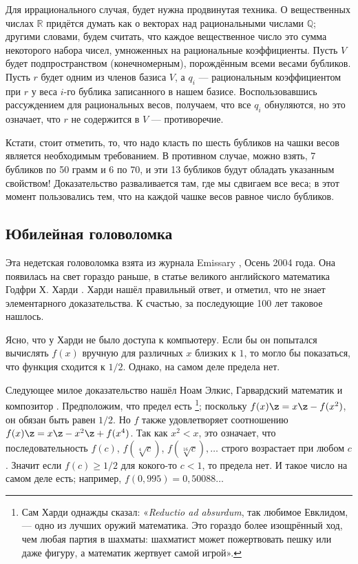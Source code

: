 Для иррационального случая, будет нужна продвинутая техника.
О вещественных числах $\mathbb{R}$ придётся думать как о векторах над рациональными числами $\mathbb{Q}$;
другими словами, будем считать, что каждое вещественное число это сумма некоторого набора чисел, умноженных на рациональные коэффициенты.
Пусть $V$ будет подпространством (конечномерным), порождённым всеми весами бубликов.
Пусть $r$ будет одним из членов базиса $V$, а $q_i$ --- рациональным коэффициентом при $r$ у веса $i$-го бублика записанного в нашем базисе.
Воспользовавшись рассуждением для рациональных весов, получаем, что все $q_i$ обнуляются, но это означает, что $r$ не содержится в $V$ --- противоречие.

Кстати, стоит отметить, то, что надо класть по шесть бубликов на чашки весов является необходимым требованием.
В противном случае, можно взять, 7 бубликов по 50 грамм и 6 по 70, и эти 13 бубликов будут обладать указанным свойством!
Доказательство разваливается там, где мы сдвигаем все веса;
в этот момент пользовались тем, что на каждой чашке весов равное число бубликов.

\subsection*{Юбилейная головоломка}

Эта недетская головоломка взята из журнала Emissary \cite{berlekamp-buhle}, Осень 2004 года.
Она появилась на свет гораздо раньше, в статье великого английского математика Годфри Х. Харди \cite{hardy}. 
Харди нашёл правильный ответ, и отметил, что не знает элементарного доказательства.
К счастью, за последующие 100 лет таковое нашлось.

Ясно, что у Харди не было доступа к компьютеру.
Если бы он попытался вычислять $f(x)$ вручную для различных $x$ близких к $1$, то могло бы показаться, что функция сходится к $1/2$.
Однако, на самом деле предела нет.

Следующее милое доказательство нашёл Ноам Элкис, Гарвардский математик и композитор \cite[Problem 8]{elkies}.
Предположим, что предел есть%
\footnote{Сам Харди однажды сказал: «\emph{Reductio ad absurdum}, так любимое Евклидом, --- одно из лучших оружий математика.
Это гораздо более изощрённый ход, чем любая партия в шахматы:
шахматист может пожертвовать пешку или даже фигуру, а математик жертвует самой игрой».};
поскольку $f(x)\z=x\z-f(x^2)$, он обязан быть равен $1/2$.
Но $f$ также удовлетворяет соотношению $f(x)\z=x\z-x^2\z+f(x^4)$.
Так как $x^2 < x$, это означает, что последовательность $f(c)$, $f(\sqrt[4]{c})$, $f(\sqrt[16]{c}),\dots$ строго возрастает при любом $c$.
Значит если $f(c)\ge1/2$ для кокого-то $c<1$, то предела нет.
И такое число на самом деле есть; например, $f(0{,}995)=0{,}50088\dots$

